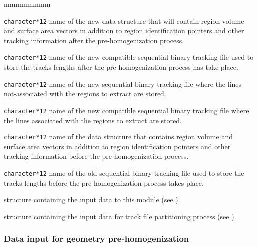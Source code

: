 \begin{ListeDeDescription}{mmmmmmmm}  

\item[\dusa{TRKENEW}] \verb|character*12| name of the new  data structure that will contain
region volume and surface area vectors in addition to region identification pointers and other tracking
information after the pre-homogenization process.

\item[\dusa{TFILENEW}] \verb|character*12| name of the new  compatible sequential binary tracking file used to store
the tracks lengths after the pre-homogenization process has take place. 

\item[\dusa{TFILEMOD}] \verb|character*12| name of the new  sequential binary tracking file where the
lines not-associated with the regions to extract are stored.

\item[\dusa{TFILEEXT}] \verb|character*12| name of the new  compatible sequential binary tracking file where the
lines associated with the regions to extract are stored.

\item[\dusa{TRKEOLD}] \verb|character*12| name of the  data structure that contains
region volume and surface area vectors in addition to region identification pointers and other tracking
information before the pre-homogenization process.

\item[\dusa{TFILEOLD}] \verb|character*12| name of the old sequential binary tracking file used to store
the tracks lengths before the pre-homogenization process takes place. 

\item[\dstr{descmrg}] structure containing the input data to this module (see ).

\item[\dstr{descextr}] structure containing the input data for track file partitioning process (see ).

\end{ListeDeDescription}


\subsubsection{Data input for geometry pre-homogenization}\label{sect:descmrg}

